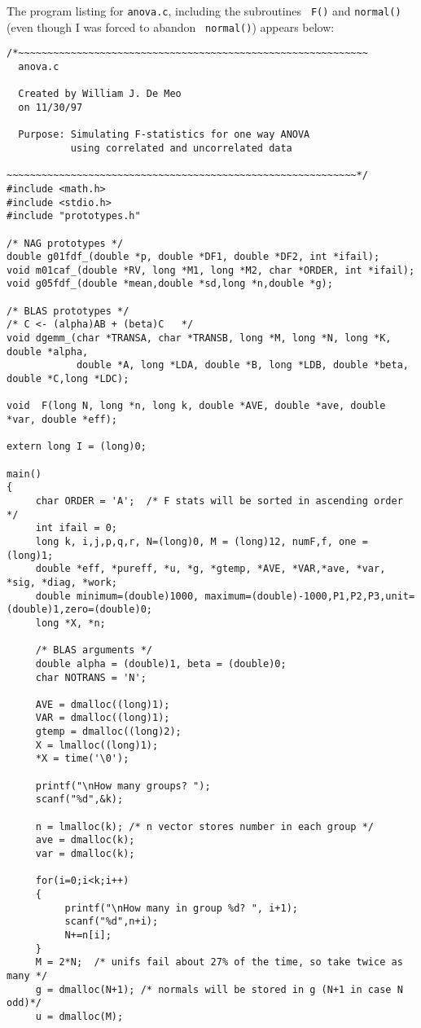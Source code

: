 \documentclass{article}
\begin{document}
The program listing for {\tt anova.c}, including the subroutines {\tt
 F()} and {\tt normal()} (even though I was forced to abandon {\tt
 normal()}) appears below:
\begin{verbatim}
/*~~~~~~~~~~~~~~~~~~~~~~~~~~~~~~~~~~~~~~~~~~~~~~~~~~~~~~~~~~~~
  anova.c

  Created by William J. De Meo
  on 11/30/97

  Purpose: Simulating F-statistics for one way ANOVA
           using correlated and uncorrelated data

~~~~~~~~~~~~~~~~~~~~~~~~~~~~~~~~~~~~~~~~~~~~~~~~~~~~~~~~~~~~*/
#include <math.h>
#include <stdio.h>
#include "prototypes.h"

/* NAG prototypes */
double g01fdf_(double *p, double *DF1, double *DF2, int *ifail);
void m01caf_(double *RV, long *M1, long *M2, char *ORDER, int *ifail);
void g05fdf_(double *mean,double *sd,long *n,double *g);

/* BLAS prototypes */
/* C <- (alpha)AB + (beta)C   */
void dgemm_(char *TRANSA, char *TRANSB, long *M, long *N, long *K, double *alpha, 
            double *A, long *LDA, double *B, long *LDB, double *beta, double *C,long *LDC); 

void  F(long N, long *n, long k, double *AVE, double *ave, double *var, double *eff);

extern long I = (long)0;

main()
{
     char ORDER = 'A';  /* F stats will be sorted in ascending order */
     int ifail = 0;
     long k, i,j,p,q,r, N=(long)0, M = (long)12, numF,f, one = (long)1;
     double *eff, *pureff, *u, *g, *gtemp, *AVE, *VAR,*ave, *var, *sig, *diag, *work;
     double minimum=(double)1000, maximum=(double)-1000,P1,P2,P3,unit=(double)1,zero=(double)0;
     long *X, *n;

     /* BLAS arguments */
     double alpha = (double)1, beta = (double)0;
     char NOTRANS = 'N';

     AVE = dmalloc((long)1);
     VAR = dmalloc((long)1);
     gtemp = dmalloc((long)2);
     X = lmalloc((long)1);
     *X = time('\0');

     printf("\nHow many groups? ");
     scanf("%d",&k);
     
     n = lmalloc(k); /* n vector stores number in each group */
     ave = dmalloc(k);
     var = dmalloc(k);

     for(i=0;i<k;i++)
     {
          printf("\nHow many in group %d? ", i+1);
          scanf("%d",n+i);
          N+=n[i];
     }
     M = 2*N;  /* unifs fail about 27% of the time, so take twice as many */
     g = dmalloc(N+1); /* normals will be stored in g (N+1 in case N odd)*/
     u = dmalloc(M);   


\end{verbatim}
\end{document}
